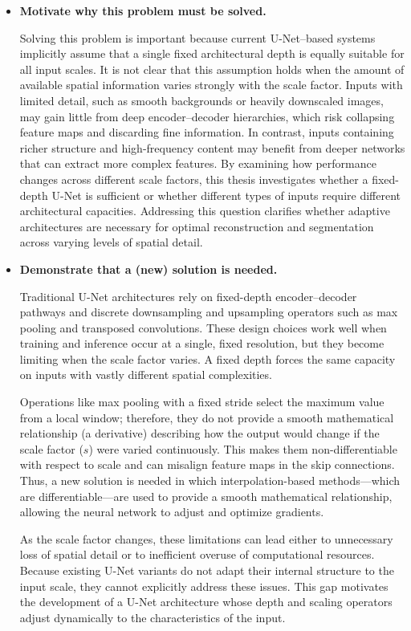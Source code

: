 \begin{itemize}

\item \textbf{Motivate why this problem must be solved.}

Solving this problem is important because current U-Net–based systems implicitly assume that a single fixed architectural depth is equally suitable for all input scales. It is not clear that this assumption holds when the amount of available spatial information varies strongly with the scale factor. Inputs with limited detail, such as smooth backgrounds or heavily downscaled images, may gain little from deep encoder–decoder hierarchies, which risk collapsing feature maps and discarding fine information. In contrast, inputs containing richer structure and high-frequency content may benefit from deeper networks that can extract more complex features. By examining how performance changes across different scale factors, this thesis investigates whether a fixed-depth U-Net is sufficient or whether different types of inputs require different architectural capacities. Addressing this question clarifies whether adaptive architectures are necessary for optimal reconstruction and segmentation across varying levels of spatial detail.

\item \textbf{Demonstrate that a (new) solution is needed.}

Traditional U-Net architectures rely on fixed-depth encoder–decoder pathways and discrete downsampling and upsampling operators such as max pooling and transposed convolutions. These design choices work well when training and inference occur at a single, fixed resolution, but they become limiting when the scale factor varies. A fixed depth forces the same capacity on inputs with vastly different spatial complexities.

Operations like max pooling with a fixed stride select the maximum value from a local window; therefore, they do not provide a smooth mathematical relationship (a derivative) describing how the output would change if the scale factor ($s$) were varied continuously. This makes them non-differentiable with respect to scale and can misalign feature maps in the skip connections. Thus, a new solution is needed in which interpolation-based methods—which are differentiable—are used to provide a smooth mathematical relationship, allowing the neural network to adjust and optimize gradients.

As the scale factor changes, these limitations can lead either to unnecessary loss of spatial detail or to inefficient overuse of computational resources. Because existing U-Net variants do not adapt their internal structure to the input scale, they cannot explicitly address these issues. This gap motivates the development of a U-Net architecture whose depth and scaling operators adjust dynamically to the characteristics of the input.


\end{itemize}
